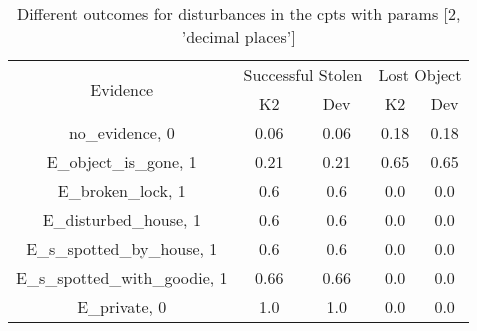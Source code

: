 \begin{table}\begin{tabular}{c|cc|cc}\toprule\multirow{2}{*}{Evidence} & \multicolumn{2}{c}{Successful Stolen} & \multicolumn{2}{c}{Lost Object} \\& {K2} & {Dev} & {K2} & {Dev} \\\midrule
no\_evidence, 0 & 0.06&0.06&0.18&0.18\\E\_object\_is\_gone, 1 & 0.21&0.21&0.65&0.65\\E\_broken\_lock, 1 & 0.6&0.6&0.0&0.0\\E\_disturbed\_house, 1 & 0.6&0.6&0.0&0.0\\E\_s\_spotted\_by\_house, 1 & 0.6&0.6&0.0&0.0\\E\_s\_spotted\_with\_goodie, 1 & 0.66&0.66&0.0&0.0\\E\_private, 0 & 1.0&1.0&0.0&0.0\\\bottomrule\end{tabular}\caption{Different outcomes for disturbances in the cpts with params [2, 'decimal places']}\end{table}